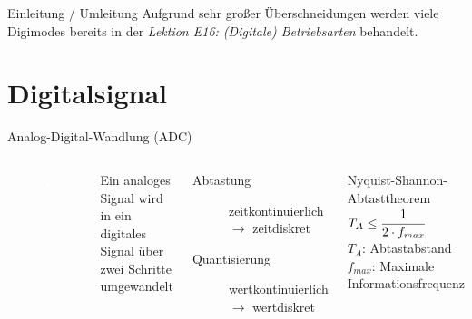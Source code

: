 

\subtitle{Technik A15: \\
Übertragungstechnik \\[2em]}
\date{Stand 06.03.2017}


\begin{frame}{Einleitung / Umleitung}
  Aufgrund sehr großer Überschneidungen werden viele Digimodes bereits in der \emph{Lektion E16: (Digitale) Betriebsarten} behandelt.
\end{frame}

\section{Digitalsignal}
\begin{frame}{Analog-Digital-Wandlung (ADC)}
  \begin{columns}
    \begin{figure}
      \includegraphics[width=\textwidth,height=.8\textheight,keepaspectratio]{a15/Uebersicht_kontinuierliche_und_diskrete_Signale.png}
    \end{figure}
    Ein analoges Signal wird in ein digitales Signal über zwei Schritte umgewandelt
    \begin{description}
      \item[Abtastung] zeitkontinuierlich $\rightarrow$ zeitdiskret
      \item[Quantisierung] wertkontinuierlich $\rightarrow$ wertdiskret
    \end{description}
    \begin{block}{Nyquist-Shannon-Abtasttheorem}
      $T_A \leq \cfrac{1}{2 \cdot f_{max}}$\\[.5em]
      $T_A$: Abtastabstand\\
      $f_{max}$: Maximale Informationsfrequenz
    \end{block}
  \end{columns}
\end{frame}

